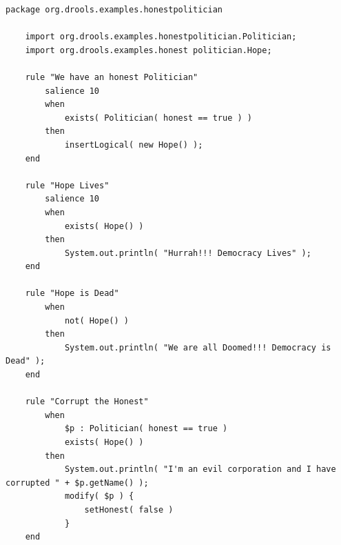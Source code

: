 \noindent\begin{minipage}{\textwidth}
    \begin{lstlisting}[language={[drl]Drools}, caption=Example Drools file, captionpos=b, label=listing:drl_file]
    package org.drools.examples.honestpolitician

    import org.drools.examples.honestpolitician.Politician;
    import org.drools.examples.honest politician.Hope;
    
    rule "We have an honest Politician"
        salience 10
        when
            exists( Politician( honest == true ) )
        then
            insertLogical( new Hope() );
    end
    
    rule "Hope Lives"
        salience 10
        when
            exists( Hope() )
        then
            System.out.println( "Hurrah!!! Democracy Lives" );
    end
    
    rule "Hope is Dead"
        when
            not( Hope() )
        then
            System.out.println( "We are all Doomed!!! Democracy is Dead" );
    end
    
    rule "Corrupt the Honest"
        when
            $p : Politician( honest == true )   
            exists( Hope() )
        then
            System.out.println( "I'm an evil corporation and I have corrupted " + $p.getName() );
            modify( $p ) { 
                setHonest( false ) 
            }
    end
    \end{lstlisting}
\end{minipage}

